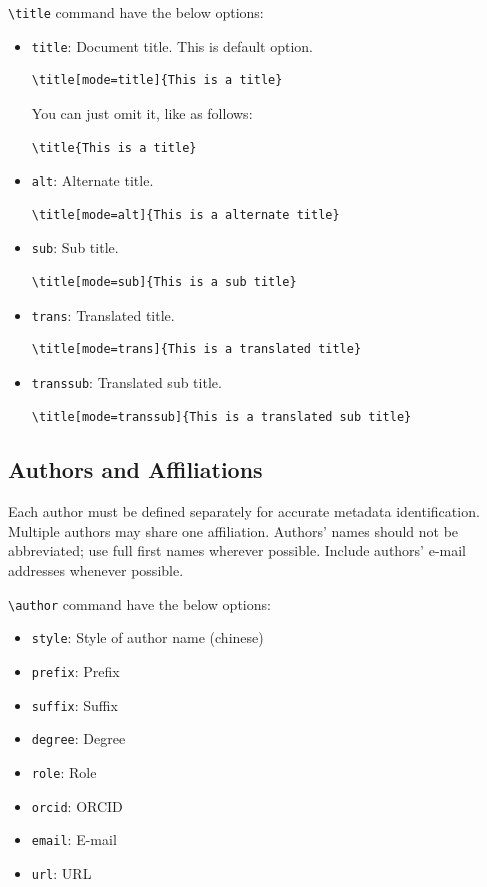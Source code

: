 \documentclass[
twocolumn,
]{ceurart}
\begin{document}
\verb|\title| command have the below options:
\begin{itemize}
\item \verb|title|: Document title. This is default option. 
\begin{verbatim}
\title[mode=title]{This is a title}
\end{verbatim}
You can just omit it, like as follows:
\begin{verbatim}
\title{This is a title}
\end{verbatim}

\item \verb|alt|: Alternate title.
\begin{verbatim}
\title[mode=alt]{This is a alternate title}
\end{verbatim}

\item \verb|sub|: Sub title.
\begin{verbatim}
\title[mode=sub]{This is a sub title}
\end{verbatim}

\item \verb|trans|: Translated title.
\begin{verbatim}
\title[mode=trans]{This is a translated title}
\end{verbatim}

\item \verb|transsub|: Translated sub title.
\begin{verbatim}
\title[mode=transsub]{This is a translated sub title}
\end{verbatim}
\end{itemize}

\subsection{Authors and Affiliations}

Each author must be defined separately for accurate metadata
identification. Multiple authors may share one affiliation. Authors'
names should not be abbreviated; use full first names wherever
possible. Include authors' e-mail addresses whenever possible.

\verb|\author| command have the below options: 

\begin{itemize}
\item \verb|style|: Style of author name (chinese)
\item \verb|prefix|: Prefix
\item \verb|suffix|: Suffix
\item \verb|degree|: Degree
\item \verb|role|: Role
\item \verb|orcid|: ORCID
\item \verb|email|: E-mail
\item \verb|url|: URL
\end{itemize}
\end{document}
